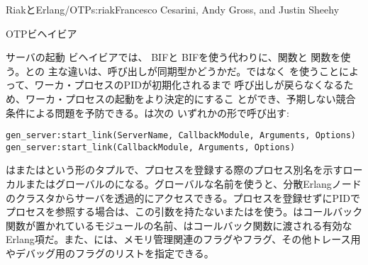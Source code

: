 \begin{aosachapter}{RiakとErlang/OTP}{s:riak}{Francesco Cesarini, Andy Gross, and Justin Sheehy}
\begin{aosasect1}{OTPビヘイビア}
\begin{aosasect2}{サーバの起動}
ビヘイビアでは、 BIFと
BIFを使う代わりに、関数と
関数を使う。との
主な違いは、呼び出しが同期型かどうかだ。ではなく
を使うことによって、ワーカ・プロセスのPIDが初期化されるまで
呼び出しが戻らなくなるため、ワーカ・プロセスの起動をより決定的にするこ
とができ、予期しない競合条件による問題を予防できる。は次の
いずれかの形で呼び出す:

\begin{verbatim}
gen_server:start_link(ServerName, CallbackModule, Arguments, Options)
gen_server:start_link(CallbackModule, Arguments, Options)
\end{verbatim}


\noindent {}はまたはという形のタプルで、プロセスを登録する際のプロセス別名を示すローカルまたはグローバルのになる。グローバルな名前を使うと、分散Erlangノードのクラスタからサーバを透過的にアクセスできる。プロセスを登録せずにPIDでプロセスを参照する場合は、この引数を持たないまたはを使う。はコールバック関数が置かれているモジュールの名前、はコールバック関数に渡される有効なErlang項だ。また、には、メモリ管理関連のフラグやフラグ、その他トレース用やデバッグ用のフラグのリストを指定できる。



\end{aosasect2}
\end{aosasect1}
\end{aosachapter}
